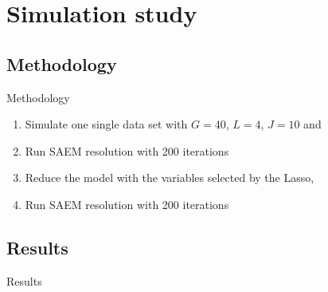 \documentclass[10pt,xcolor={dvipsnames}]{beamer}
\begin{document}

\section{Simulation study}

\subsection{Methodology}
\begin{frame}{Methodology}

\begin{enumerate}
    \item Simulate one single data set with $G = 40$, $L = 4$,  $J = 10$ and 
    \item Run SAEM resolution with 200 iterations
    
    \begin{center}
    \end{center}
    
    
    \item Reduce the model with the variables selected by the Lasso, 
    \item Run SAEM resolution with 200 iterations
    
    \begin{center}
    \end{center}
    
\end{enumerate}

\end{frame}

\subsection{Results}
\begin{frame}{Results}
    
    
\end{frame}
\end{document}
